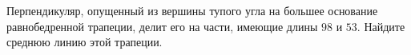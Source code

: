 \begin{ex}
	\begin{condition}
		Перпендикуляр, опущенный из вершины тупого угла на большее основание равнобедренной трапеции, делит его на части, имеющие длины \( 98  \) и \( 53 \). Найдите среднюю линию этой трапеции.
	\end{condition}
\end{ex}
